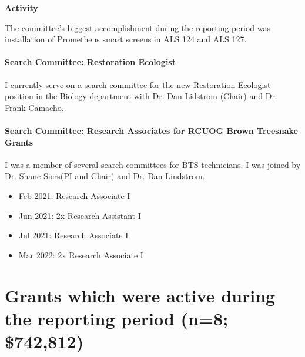 \raggedright\vspace{2mm}\textbf{Activity}
	
The committee's biggest accomplishment during the reporting period was installation of Prometheus smart screens in ALS 124 and ALS 127.

\paragraph{Search Committee: Restoration Ecologist}

I currently serve on a search committee for the new Restoration Ecologist position in the Biology department with Dr. Dan Lidstrom (Chair) and Dr. Frank Camacho.

\paragraph{Search Committee: Research Associates for RCUOG Brown Treesnake Grants}

I was a member of several search committees for BTS technicians. I was joined by Dr. Shane Siers(PI and Chair) and Dr. Dan Lindstrom.
\begin{itemize}
	\item Feb 2021: Research Associate I
    \item Jun 2021: 2x Research Assistant I
    \item Jul 2021: Research Associate I
	\item Mar 2022: 2x Research Associate I
\end{itemize}
\begin{comment}
\paragraph{Plans for 14JUN2021-15JUN2022}
I will continue to serve on Faculty committees.

\paragraph{Plans for 14JUN2022-15JUN2023}
I will continue to serve on Faculty committees.

None.
\end{comment}


\newpage
\section{Grants which were active during the reporting period (n=8; \$742,812)}

